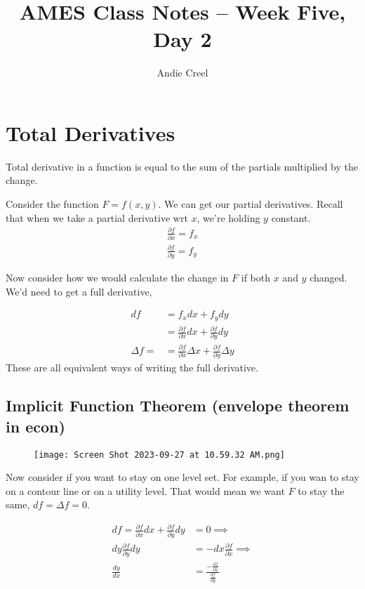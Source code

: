 \documentclass{article}
\title{AMES Class Notes -- Week Five, Day 2}
\author{Andie Creel}
\begin{document}
\maketitle

\section{Total Derivatives}
Total derivative in a function is equal to the sum of the partials multiplied by the change. 

Consider the function $ F = f(x,y)$. We can get our partial derivatives. Recall that when we take a partial derivative wrt $x$, we're holding $y$ constant.
\begin{align}
    \frac{\partial f}{\partial x} = f_x\\
    \frac{\partial f}{\partial y} = f_y
\end{align}

Now consider how we would calculate the change in $F$ if both $x$ and $y$ changed. We'd need to get a full derivative, 

\begin{align}
    df &= f_x dx + f_y dy \\
    &= \frac{\partial f}{\partial x} dx + \frac{\partial f}{\partial y} dy\\
    \Delta f = &= \frac{\partial f}{\partial x} \Delta x + \frac{\partial f}{\partial y} \Delta y
\end{align}
These are all equivalent ways of writing the full derivative. 


\subsection{Implicit Function Theorem (envelope theorem in econ)}

\begin{figure}[htp]
    \centering
        \texttt{[image: Screen Shot 2023-09-27 at 10.59.32 AM.png]}
\end{figure}

Now consider if you want to stay on one level set. For example, if you wan to stay on a contour line or on a utility level. That would mean we want $F$ to stay the same, $df = \Delta f = 0$. 

\begin{align}
    d f = \frac{\partial f}{\partial x} dx + \frac{\partial f}{\partial y} dy &= 0 \implies \\
    dy \frac{\partial f}{\partial y} dy &= - dx \frac{\partial f}{\partial x} \implies \\
    \frac{d y}{dx} &= \frac{- \frac{\partial f}{\partial x}}{\frac{\partial f}{\partial y}} \label{imp_func}
\end{align}
\end{document}
